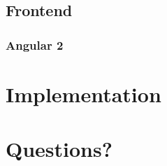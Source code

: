 \documentclass{beamer}
\begin{document}
\subsection{Frontend}

\begin{frame}
	\frametitle{Angular 2}
\end{frame}

\section{Implementation}

\section{Questions?}
\end{document}
